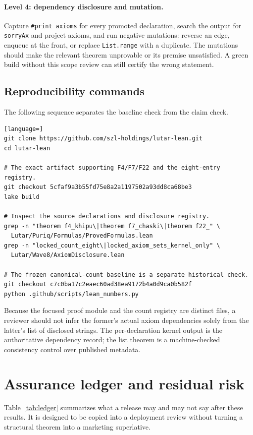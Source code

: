\documentclass[11pt,letterpaper]{article}
\theoremstyle{definition}
\begin{document}
\paragraph{Level 4: dependency disclosure and mutation.} Capture
\texttt{\#print axioms} for every promoted declaration, search the output for
\texttt{sorryAx} and project axioms, and run negative mutations: reverse an
edge, enqueue at the front, or replace \texttt{List.range} with a duplicate.
The mutations should make the relevant theorem unprovable or its premise
unsatisfied. A green build without this scope review can still certify the
wrong statement.

\subsection{Reproducibility commands}

The following sequence separates the baseline check from the claim check.

\begin{lstlisting}[language=]
git clone https://github.com/szl-holdings/lutar-lean.git
cd lutar-lean

# The exact artifact supporting F4/F7/F22 and the eight-entry registry.
git checkout 5cfaf9a3b55fd75e8a2a1197502a93dd8ca68be3
lake build

# Inspect the source declarations and disclosure registry.
grep -n "theorem f4_khipu\|theorem f7_chaski\|theorem f22_" \
  Lutar/Puriq/Formulas/ProvedFormulas.lean
grep -n "locked_count_eight\|locked_axiom_sets_kernel_only" \
  Lutar/Wave8/AxiomDisclosure.lean

# The frozen canonical-count baseline is a separate historical check.
git checkout c7c0ba17c2eaec60ad38ea9172b4a0d9ca0b582f
python .github/scripts/lean_numbers.py
\end{lstlisting}

Because the focused proof module and the count registry are distinct files, a
reviewer should not infer the former's actual axiom dependencies solely from
the latter's list of disclosed strings. The per-declaration kernel output is
the authoritative dependency record; the list theorem is a machine-checked
consistency control over published metadata.

\section{Assurance ledger and residual risk}
\label{sec:ledger}

Table~\ref{tab:ledger} summarizes what a release may and may not say after these
results. It is designed to be copied into a deployment review without turning a
structural theorem into a marketing superlative.
\end{document}
